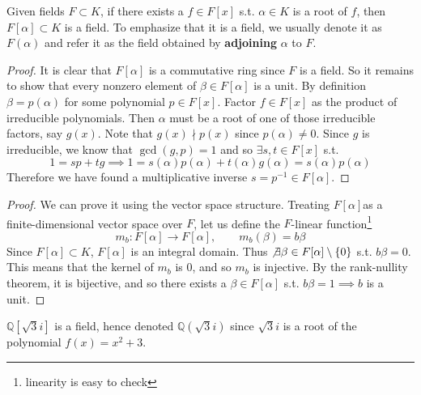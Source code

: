    \begin{theorem}
      Given fields $F \subset K$, if there exists a $f \in F[x]$ s.t. $\alpha \in K$ is a root of $f$, then $F[\alpha] \subset K$ is a field. To emphasize that it is a field, we usually denote it as $F(\alpha)$ and refer it as the field obtained by \textbf{adjoining} $\alpha$ to $F$. 
    \end{theorem}
    \begin{proof}
      It is clear that $F[\alpha]$ is a commutative ring since $F$ is a field. So it remains to show that every nonzero element of $\beta \in F[\alpha]$ is a unit. By definition $\beta = p(\alpha)$ for some polynomial $p \in F[x]$.  Factor $f \in F[x]$ as the product of irreducible polynomials. Then $\alpha$ must be a root of one of those irreducible factors, say $g(x)$. Note that $g(x) \nmid p(x)$ since $p(\alpha) \neq 0$. Since $g$ is irreducible, we know that $\gcd(g, p) = 1$ and so $\exists s, t \in F[x]$ s.t. 
      \begin{equation}
        1 = s p + t g \implies 1 = s(\alpha) p(\alpha) + t(\alpha) g(\alpha) = s(\alpha) p(\alpha)
      \end{equation}  
      Therefore we have found a multiplicative inverse $s = p^{-1} \in F[\alpha]$. 
    \end{proof} 
    \begin{proof}
      We can prove it using the vector space structure. Treating $F[\alpha]$as a finite-dimensional vector space over $F$, let us define the $F$-linear function\footnote{linearity is easy to check}
      \begin{equation}
        m_b: F[\alpha] \rightarrow F[\alpha], \qquad m_b (\beta) = b\beta
      \end{equation} 
      Since $F[\alpha] \subset K$, $F[\alpha]$ is an integral domain. Thus $\not\exists \beta \in F[\alpha] \setminus \{0\}$ s.t. $b \beta = 0$. This means that the kernel of $m_b$ is $0$, and so $m_b$ is injective. By the rank-nullity theorem, it is bijective, and so there exists a $\beta \in F[\alpha]$ s.t. $b \beta = 1 \implies b$ is a unit. 
    \end{proof}

    \begin{example}
      $\mathbb{Q}[\sqrt{3} i]$ is a field, hence denoted $\mathbb{Q}(\sqrt{3} i)$ since $\sqrt{3}i$ is a root of the polynomial $f(x) = x^2 + 3$. 
    \end{example}

